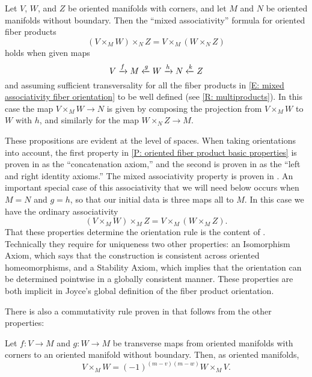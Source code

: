 \begin{proposition}\label{P: oriented fiber mixed associativity}
	Let $V$, $W$, and $Z$ be oriented manifolds with corners, and let $M$ and $N$ be oriented manifolds without boundary.
	Then the ``mixed associativity'' formula for oriented fiber products
	\begin{equation}\label{E: mixed associativity fiber orientation}
		(V\times_MW)\times_N Z=V\times_M(W\times_N Z)
	\end{equation}
	holds when given maps
	$$V\xrightarrow{f} M\xleftarrow{g} W\xrightarrow{h} N\xleftarrow{k} Z$$
	and assuming sufficient transversality for all the fiber products in \eqref{E: mixed associativity fiber orientation} to be well defined (see \cref{R: multiproducts}).
	In this case the map $V\times_MW\to N$ is given by composing the projection from $V\times_MW$ to $W$ with $h$, and similarly for the map $W\times_N Z\to M$.
\end{proposition}

These propositions are evident at the level of spaces.
When taking orientations into account, the first property in \cref{P: oriented fiber product basic properties} is proven in \cite[Sections 9.3.9]{RamBas09} as the ``concatenation axiom,'' and the second is proven in \cite[Sections 9.3.5 and 9.3.6]{RamBas09} as the ``left and right identity axioms.''
The mixed associativity property is proven in \cite[Sections 9.3.7]{RamBas09}.
An important special case of this associativity that we will need below occurs when $M=N$ and $g=h$, so that our initial data is three maps all to $M$.
In this case we have the ordinary associativity
\begin{equation}\label{E: oriented fiber associativity}
	(V\times_MW)\times_M Z=V\times_M(W\times_M Z).
\end{equation}
That these properties determine the orientation rule is the content of \cite[Theorem 9-10]{RamBas09}.
Technically they require for uniqueness two other properties: an Isomorphism Axiom, which says that the construction is consistent across oriented homeomorphisms, and a Stability Axiom, which implies that the orientation can be determined pointwise in a globally consistent manner.
These properties are both implicit in Joyce's global definition of the fiber product orientation.

There is also a commutativity rule proven in \cite[Sections 9.3.8]{RamBas09} that follows from the other properties:

\begin{proposition}\label{P: commute oriented fiber}
	Let $f \colon V\to M$ and $g \colon W\to M$ be transverse maps from oriented manifolds with corners to an oriented manifold without boundary.
	Then, as oriented manifolds,
	\begin{equation*}
		V\times_M W=(-1)^{(m-v)(m-w)}W\times_M V.
	\end{equation*}
\end{proposition}

